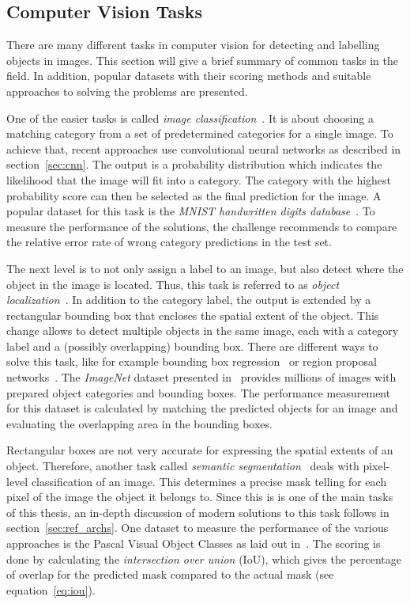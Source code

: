 \subsection{Computer Vision Tasks}
There are many different tasks in computer vision for detecting and labelling objects in images. This section will give a brief summary of common tasks in the field. In addition, popular datasets with their scoring methods and suitable approaches to solving the problems are presented.

One of the easier tasks is called \emph{image classification}~\cite[p.~98]{DLbook16}. It is about choosing a matching category from a set of predetermined categories for a single image. To achieve that, recent approaches use convolutional neural networks as described in section~\ref{sec:cnn}. The output is a probability distribution which indicates the likelihood that the image will fit into a category. The category with the highest probability score can then be selected as the final prediction for the image. A popular dataset for this task is the \emph{MNIST handwritten digits database}~\cite{mnist10}. To measure the performance of the solutions, the challenge recommends to compare the relative error rate of wrong category predictions in the test set.

The next level is to not only assign a label to an image, but also detect where the object in the image is located. Thus, this task is referred to as \emph{object localization}~\cite{rcnn14}. In addition to the category label, the output is extended by a rectangular bounding box that encloses the spatial extent of the object. This change allows to detect multiple objects in the same image, each with a category label and a (possibly overlapping) bounding box. There are different ways to solve this task, like for example bounding box regression~\cite{obj_detection13} or region proposal networks~\cite{ff-rcnn14}. The \emph{ImageNet} dataset presented in~\cite{imgnet09} provides millions of images with prepared object categories and bounding boxes. The performance measurement for this dataset is calculated by matching the predicted objects for an image and evaluating the overlapping area in the bounding boxes.

Rectangular boxes are not very accurate for expressing the spatial extents of an object. Therefore, another task called \emph{semantic segmentation}~\cite{weakseg15} deals with pixel-level classification of an image. This determines a precise mask telling for each pixel of the image the object it belongs to. Since this is is one of the main tasks of this thesis, an in-depth discussion of modern solutions to this task follows in section~\ref{sec:ref_archs}. One dataset to measure the performance of the various approaches is the Pascal Visual Object Classes as laid out in~\cite{pascal_voc15}. The scoring is done by calculating the \emph{intersection over union} (IoU), which gives the percentage of overlap for the predicted mask compared to the actual mask (see equation~\ref{eq:iou}).

